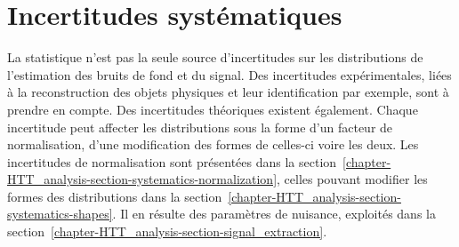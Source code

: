 \section{Incertitudes systématiques}\label{chapter-HTT_analysis-section-systematics}
La statistique n'est pas la seule source d'incertitudes sur les distributions de l'estimation des bruits de fond et du signal.
Des incertitudes expérimentales, liées à la reconstruction des objets physiques et leur identification par exemple, sont à prendre en compte.
Des incertitudes théoriques existent également.
Chaque incertitude peut affecter les distributions sous la forme d'un facteur de normalisation, d'une modification des formes de celles-ci voire les deux.
Les incertitudes de normalisation sont présentées dans la section~\ref{chapter-HTT_analysis-section-systematics-normalization},
celles pouvant modifier les formes des distributions dans la section~\ref{chapter-HTT_analysis-section-systematics-shapes}.
Il en résulte des paramètres de nuisance, exploités dans la section~\ref{chapter-HTT_analysis-section-signal_extraction}.

